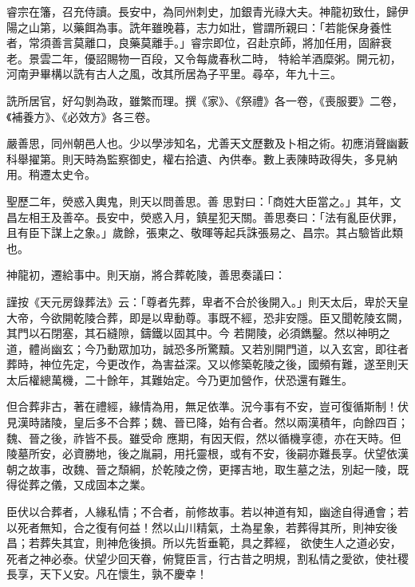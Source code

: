 \begin{pinyinscope}
 睿宗在籓，召充侍讀。長安中，為同州刺史，加銀青光祿大夫。神龍初致仕，歸伊陽之山第，以藥餌為事。詵年雖晚暮，志力如壯，嘗謂所親曰：「若能保身養性者，常須善言莫離口，良藥莫離手。」睿宗即位，召赴京師，將加任用，固辭衰老。景雲二年，優詔賜物一百段，又令每歲春秋二時，
 特給羊酒糜粥。開元初，河南尹畢構以詵有古人之風，改其所居為子平里。尋卒，年九十三。



 詵所居官，好勾剝為政，雖繁而理。撰《家》、《祭禮》各一卷，《喪服要》二卷，《補養方》、《必效方》各三卷。



 嚴善思，同州朝邑人也。少以學涉知名，尤善天文歷數及卜相之術。初應消聲幽藪科舉擢第。則天時為監察御史，權右拾遺、內供奉。數上表陳時政得失，多見納用。稍遷太史令。



 聖歷二年，熒惑入輿鬼，則天以問善思。善
 思對曰：「商姓大臣當之。」其年，文昌左相王及善卒。長安中，熒惑入月，鎮星犯天關。善思奏曰：「法有亂臣伏罪，且有臣下謀上之象。」歲餘，張柬之、敬暉等起兵誅張易之、昌宗。其占驗皆此類也。



 神龍初，遷給事中。則天崩，將合葬乾陵，善思奏議曰：



 謹按《天元房錄葬法》云：「尊者先葬，卑者不合於後開入。」則天太后，卑於天皇大帝，今欲開乾陵合葬，即是以卑動尊。事既不經，恐非安隱。臣又聞乾陵玄闕，其門以石閉塞，其石縫隙，鑄鐵以固其中。今
 若開陵，必須鐫鑿。然以神明之道，體尚幽玄；今乃動眾加功，誠恐多所驚黷。又若別開門道，以入玄宮，即往者葬時，神位先定，今更改作，為害益深。又以修築乾陵之後，國頻有難，遂至則天太后權總萬機，二十餘年，其難始定。今乃更加營作，伏恐還有難生。



 但合葬非古，著在禮經，緣情為用，無足依準。況今事有不安，豈可復循斯制！伏見漢時諸陵，皇后多不合葬；魏、晉已降，始有合者。然以兩漢積年，向餘四百；魏、晉之後，祚皆不長。雖受命
 應期，有因天假，然以循機享德，亦在天時。但陵墓所安，必資勝地，後之胤嗣，用托靈根，或有不安，後嗣亦難長享。伏望依漢朝之故事，改魏、晉之頹綱，於乾陵之傍，更擇吉地，取生墓之法，別起一陵，既得從葬之儀，又成固本之業。



 臣伏以合葬者，人緣私情；不合者，前修故事。若以神道有知，幽途自得通會；若以死者無知，合之復有何益！然以山川精氣，土為星象，若葬得其所，則神安後昌；若葬失其宜，則神危後損。所以先哲垂範，具之葬經，
 欲使生人之道必安，死者之神必泰。伏望少回天眷，俯覽臣言，行古昔之明規，割私情之愛欲，使社稷長享，天下乂安。凡在懷生，孰不慶幸！




\end{pinyinscope}
